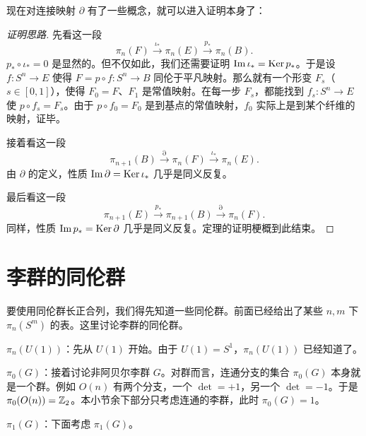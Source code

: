 现在对连接映射 $\partial$ 有了一些概念，就可以进入证明本身了：

\begin{proof}[证明思路]
先看这一段
\begin{equation}
\pi_n(F)\xrightarrow{\iota_*}\pi_n(E)\xrightarrow{p_*}\pi_n(B).
\tag{4.53}
\end{equation}
$p_*\circ\iota_*=0$ 是显然的。但不仅如此，我们还需要证明 $\mathrm{Im}\,\iota_*=\operatorname{Ker} p_*$。于是设 $f:S^n\to E$ 使得 $F=p\circ f:S^n\to B$ 同伦于平凡映射。那么就有一个形变 $F_s$（$s\in[0,1]$），使得 $F_0=F$、$F_1$ 是常值映射。在每一步 $F_s$，都能找到 $f_s:S^n\to E$ 使 $p\circ f_s=F_s$。由于 $p\circ f_0=F_0$ 是到基点的常值映射，$f_0$ 实际上是到某个纤维的映射，证毕。

接着看这一段
\begin{equation}
\pi_{n+1}(B)\xrightarrow{\partial}\pi_n(F)\xrightarrow{\iota_*}\pi_n(E).
\tag{4.54}
\end{equation}
由 $\partial$ 的定义，性质 $\mathrm{Im}\,\partial=\operatorname{Ker}\iota_*$ 几乎是同义反复。

最后看这一段
\begin{equation}
\pi_{n+1}(E)\xrightarrow{p_*}\pi_{n+1}(B)\xrightarrow{\partial}\pi_n(F).
\tag{4.55}
\end{equation}
同样，性质 $\mathrm{Im}\,p_*=\operatorname{Ker}\partial$ 几乎是同义反复。定理的证明梗概到此结束。
\end{proof}


\section{李群的同伦群}

要使用同伦群长正合列，我们得先知道一些同伦群。前面已经给出了某些 $n,m$ 下 $\pi_n(S^m)$ 的表。这里讨论李群的同伦群。

\noindent$\pi_n(U(1))$：先从 $U(1)$ 开始。由于 $U(1)=S^1$，$\pi_n(U(1))$ 已经知道了。

\noindent$\pi_0(G)$：接着讨论非阿贝尔李群 $G$。对群而言，连通分支的集合 $\pi_0(G)$ 本身就是一个群。例如 $O(n)$ 有两个分支，一个 $\det=+1$，另一个 $\det=-1$。于是 $\pi_0(O(n))=\mathbb{Z}_2$。本小节余下部分只考虑连通的李群，此时 $\pi_0(G)=1$。

\noindent$\pi_1(G)$：下面考虑 $\pi_1(G)$。

